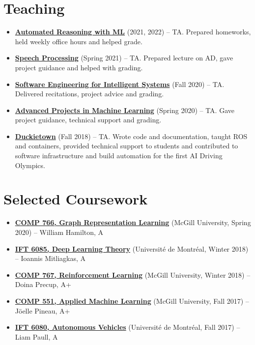 \documentclass[letterpaper,11pt]{article}
\newcommand{\resumeItem}[2]{
  \item\small{\textbf{#1}{ #2 }}
}
\newcommand{\resumeSubItem}[2]{\resumeItem{#1}{#2}}
\newcommand{\resumeSubHeadingListStart}{\begin{itemize}[leftmargin=*]}
\newcommand{\resumeSubHeadingListEnd}{\end{itemize}}
\begin{document}
\begin{justify}
\section{Teaching}
\resumeSubHeadingListStart
\resumeSubItem{\href{https://www.cs.mcgill.ca/~xsi/comp-597-fall21.html}{Automated Reasoning with ML}}{(2021, 2022) -- TA. Prepared homeworks, held weekly office hours and helped grade.}
\resumeSubItem{\href{https://speechbrain.github.io}{Speech Processing}}{(Spring 2021) -- TA. Prepared lecture on AD, gave project guidance and helped with grading.}
\resumeSubItem{\href{https://github.com/jin-guo/COMP598_Fall2020}{Software Engineering for Intelligent Systems}}{(Fall 2020) -- TA. Delivered recitations, project advice and grading.}
\resumeSubItem{\href{https://admission.umontreal.ca/cours-et-horaires/cours/IFT-6759/}{Advanced Projects in Machine Learning}}{(Spring 2020) -- TA. Gave project guidance, technical support and grading.}
\resumeSubItem{\href{https://duckietown.org/}{Duckietown}}{(Fall 2018) -- TA. Wrote code and documentation, taught ROS and containers, provided technical support to students and contributed to software infrastructure and build automation for the first AI Driving Olympics.}
\resumeSubHeadingListEnd

\section{Selected Coursework}
\resumeSubHeadingListStart
\resumeSubItem{\href{https://cs.mcgill.ca/~wlh/comp766/}{COMP 766, Graph Representation Learning}}{(McGill University, Spring 2020) -- William Hamilton, A}
\resumeSubItem{\href{https://mitliagkas.github.io/ift6085-dl-theory-class/}{IFT 6085, Deep Learning Theory}}{(Universit\'e de Montr\'eal, Winter 2018) -- Ioannis Mitliagkas, A}
\resumeSubItem{\href{https://www.cs.mcgill.ca/~dprecup/courses/rl.html}{COMP 767, Reinforcement Learning}}{(McGill University, Winter 2018) -- Doina Precup, A+}
\resumeSubItem{\href{https://www.cs.mcgill.ca/~jpineau/comp551/index.html}{COMP 551, Applied Machine Learning}}{(McGill University, Fall 2017) -- J\"oelle Pineau, A+}
\resumeSubItem{\href{http://liampaull.ca/courses/duckietown/index.html}{IFT 6080, Autonomous Vehicles}}{(Universit\'e de Montr\'eal, Fall 2017) -- Liam Paull, A}
\resumeSubHeadingListEnd


\end{justify}
\end{document}

